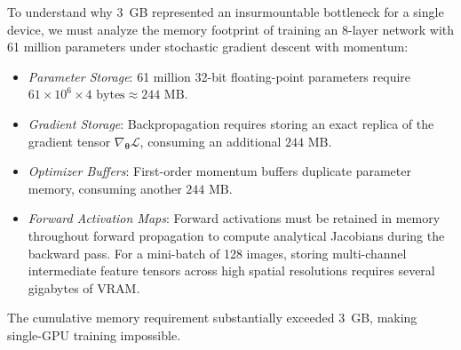 To understand why 3~GB represented an insurmountable bottleneck for a single device, we must analyze the memory footprint of training an 8-layer network with 61 million parameters under stochastic gradient descent with momentum:
\begin{itemize}[leftmargin=*]
  \item \textit{Parameter Storage}: 61 million 32-bit floating-point parameters require $61 \times 10^6 \times 4 \text{ bytes} \approx 244\text{ MB}$.
  \item \textit{Gradient Storage}: Backpropagation requires storing an exact replica of the gradient tensor $\nabla_{\boldsymbol{\theta}} \mathcal{L}$, consuming an additional $244\text{ MB}$.
  \item \textit{Optimizer Buffers}: First-order momentum buffers duplicate parameter memory, consuming another $244\text{ MB}$.
  \item \textit{Forward Activation Maps}: Forward activations must be retained in memory throughout forward propagation to compute analytical Jacobians during the backward pass. For a mini-batch of 128 images, storing multi-channel intermediate feature tensors across high spatial resolutions requires several gigabytes of VRAM.
\end{itemize}
The cumulative memory requirement substantially exceeded 3~GB, making single-GPU training impossible.

